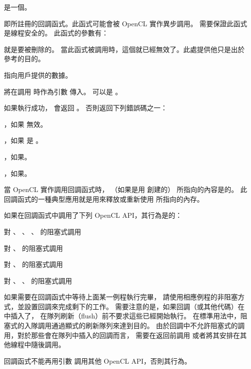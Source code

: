  是一個。

 即所註冊的回調函式。此函式可能會被 OpenCL 實作異步調用。
需要保證此函式是線程安全的。
此函式的參數有：
\startigBase
\item {} 就是要被刪除的。
當此函式被調用時，這個就已經無效了。此處提供他只是出於參考的目的。

\item {} 指向用戶提供的數據。
\stopigBase

 將在調用  時作為引數  傳入。
 可以是 。

如果執行成功，  會返回 。
否則返回下列錯誤碼之一：
\startigBase
\item {}，如果  無效。

\item {}，如果  是 。

\item {}，如果\scdevfailres。

\item {}，如果\schostfailres。
\stopigBase

\startnotepar
當 OpenCL 實作調用回調函式時，
 （如果是用  創建的）
所指向的內容是的。
此回調函式的一種典型應用就是用來釋放或重新使用  所指向的內存。

如果在回調函式中調用了下列 OpenCL API，其行為是的：
\startigBase
\item {}

\item {}

\item 對 、 、
、  的阻塞式調用

\item 對 、  的阻塞式調用

\item 對 、  的阻塞式調用

\item 對 、 、
 的阻塞式調用
\stopigBase

如果需要在回調函式中等待上面某一例程執行完畢，
請使用相應例程的非阻塞方式，並設置回調來完成剩下的工作。
需要注意的是，如果回調（或其他代碼）在中插入了，
在隊列刷新（flush）前不要求這些已經開始執行。
在標準用法中，阻塞式的入隊調用通過顯式的刷新隊列來達到目的。
由於回調中不允許阻塞式的調用，對於那些會在隊列中插入的回調而言，
需要在返回前調用  或者將其安排在其他線程中隨後調用。

回調函式不能再用引數  調用其他 OpenCL API，否則其行為。
\stopnotepar

